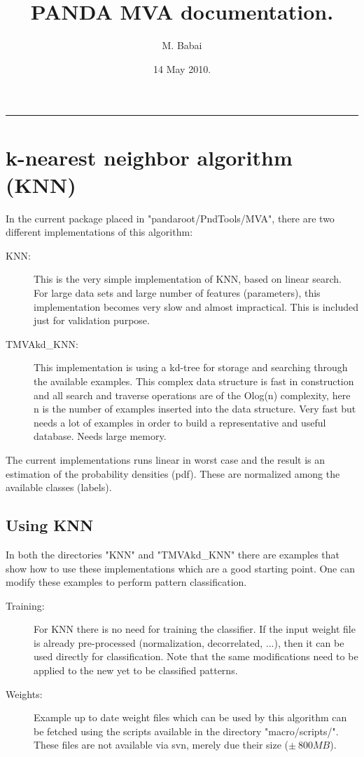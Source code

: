 \documentclass[twoside, a4paper, final]{article}
\title{PANDA MVA documentation.}
\author{M. Babai}
\date{14 May 2010.}
\begin{document}
\maketitle
\begin{center}
\rule[0.1mm]{5.0cm}{2.0mm}
\end{center}
\tableofcontents
\hrulefill
\newpage
\section{k-nearest neighbor algorithm (KNN)}
In the current package placed in "pandaroot/PndTools/MVA", there are
two different implementations of this algorithm:
\begin{description}
\item [KNN:] This is the very simple implementation of KNN, based on
  linear search. For large data sets and large number of features
  (parameters), this implementation becomes very slow and almost
  impractical. This is included just for validation purpose.
\item [TMVAkd\_KNN:] This implementation is using a kd-tree for
  storage and searching through the available examples. This complex
  data structure is fast in construction and all search and traverse
  operations are of the Olog(n) complexity, here n is the number of
  examples inserted into the data structure. Very fast but needs a lot
  of examples in order to build a representative and useful
  database. Needs large memory.
\end{description}

The current implementations runs linear in worst case and the result
is an estimation of the probability densities (pdf). These are
normalized among the available classes (labels).

\subsection{Using KNN}
In both the directories "KNN" and "TMVAkd\_KNN" there are examples
that show how to use these implementations which are a good starting
point. One can modify these examples to perform pattern
classification.
\begin{description}
\item [Training:] For KNN there is no need for training the
  classifier. If the input weight file is already pre-processed
  (normalization, decorrelated, ...), then it can be used directly for
  classification. Note that the same modifications need to be applied
  to the new yet to be classified patterns.
\item [Weights:] Example up to date weight files which can be used by
  this algorithm can be fetched using the scripts available in the
  directory "macro/scripts/". These files are not available via svn,
  merely due their size ($\pm \ 800MB$).
\end{description}
\end{document}
